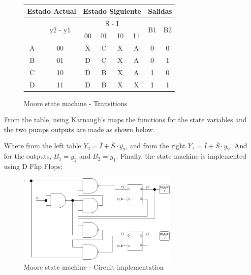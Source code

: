 \begin{figure}[H]
\begin{centering}
\begin{tabular}{|c|c|c|c|c|c||c|c|}
    \hline 
    \multicolumn{2}{|c|}{Estado Actual} & \multicolumn{4}{c||}{Estado Siguiente} & \multicolumn{2}{c|}{Salidas}\tabularnewline
    \hline 
    \hline 
    \multirow{2}{*}{} & \multirow{2}{*}{y2 - y1} & \multicolumn{4}{c||}{S - I} & \multirow{2}{*}{B1} & \multirow{2}{*}{B2}\tabularnewline
    \cline{3-6} 
     &  & 00 & 01 & 10 & 11 &  & \tabularnewline
    \hline 
    A & 00 & X & C & X & A & 0 & 0\tabularnewline
    \hline 
    B & 01 & D & C & X & A & 0 & 1\tabularnewline
    \hline 
    C & 10 & D & B & X & A & 1 & 0\tabularnewline
    \hline 
    D & 11 & D & B & X & X & 1 & 1\tabularnewline
    \hline 
    \end{tabular}
    \caption{Moore state machine - Transitions}
\end{centering}
\end{figure}

\newpage

From the table, using Karnaugh's maps the 
functions for the state variables and the 
two pumps outputs are made as shown below.

\begin{center}
\begin{Karnaugh}
\end{Karnaugh}
\begin{Karnaugh}
\end{Karnaugh}
\end{center}

Where from the left table $Y_2 = \overline{I} + \overline{S} \cdot \overline{y_2}$, 
and from the right $Y_1 = \overline{I} + \overline{S} \cdot y_2$. And for
the outputs, $B_1 = y_2$ and $B_2 = y_1$.  
Finally, the state machine is implemented using 
D Flip Flops:

\begin{figure}[H]
    \begin{centering}
    \includegraphics[width=0.7\textwidth]{Graficos1/1a_Compuertas_Moore.png}
    \par\end{centering}
    \caption{Moore state machine - Circuit implementation}
\end{figure}

